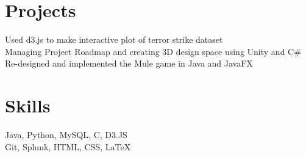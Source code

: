 \documentclass[]{deedy-resume-openfont}
\begin{document}
\begin{minipage}[t]{.65\textwidth}
\section{Projects}
\hspace{1 mm} Used d3.js to make interactive plot of terror strike dataset  \\ 
\hspace{1 mm} Managing Project Roadmap and creating 3D design space using Unity and C\#  \\ 
\hspace{1 mm} Re-designed and implemented the Mule game in Java and JavaFX\\
\end{minipage}
\hfill
\begin{minipage}[t]{.25\textwidth}
\section{Skills}
 Java, Python, MySQL, C, D3.JS\\
 Git, Splunk, HTML, CSS, \LaTeX\\
\end{minipage}
\end{document}

